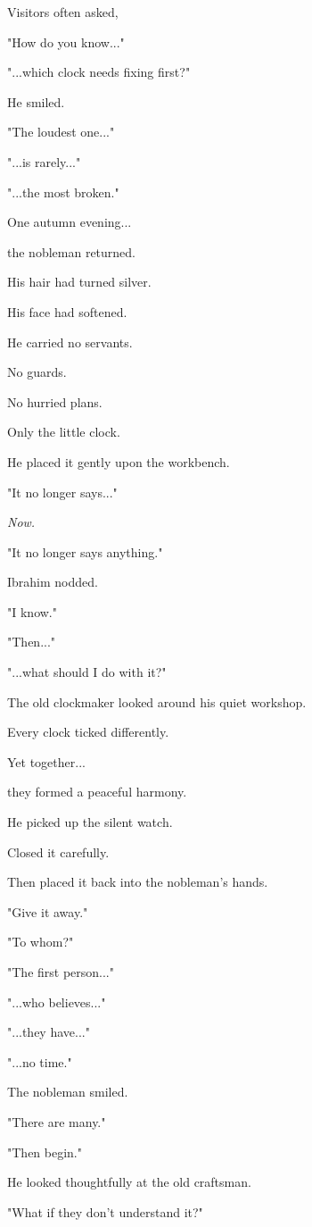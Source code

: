 \documentclass[12pt,openany]{book}
\begin{document}
Visitors often asked,

"How do you know..."

"...which clock needs fixing first?"

He smiled.

"The loudest one..."

"...is rarely..."

"...the most broken."

One autumn evening...

the nobleman returned.

His hair had turned silver.

His face had softened.

He carried no servants.

No guards.

No hurried plans.

Only the little clock.

He placed it gently upon the workbench.

"It no longer says..."

\emph{Now.}

"It no longer says anything."

Ibrahim nodded.

"I know."

"Then..."

"...what should I do with it?"

The old clockmaker looked around his quiet workshop.

Every clock ticked differently.

Yet together...

they formed a peaceful harmony.

He picked up the silent watch.

Closed it carefully.

Then placed it back into the nobleman's hands.

"Give it away."

"To whom?"

"The first person..."

"...who believes..."

"...they have..."

"...no time."

The nobleman smiled.

"There are many."

"Then begin."

He looked thoughtfully at the old craftsman.

"What if they don't understand it?"
\end{document}
